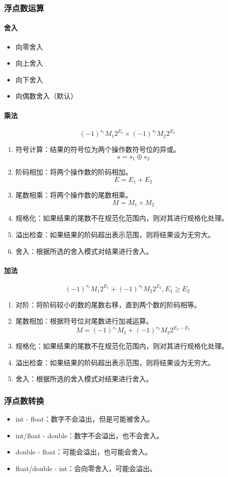 \subsubsection{浮点数运算}
\paragraph{舍入}
\begin{itemize}
    \item 向零舍入
    \item 向上舍入
    \item 向下舍入
    \item 向偶数舍入（默认）
\end{itemize}

\paragraph{乘法}
$$ (-1)^{s_1}M_1 2^{E_1} \times (-1)^{s_2}M_2 2^{E_2} $$
\begin{enumerate}
    \item 符号计算：结果的符号位为两个操作数符号位的异或。
    $$s = s_1 \oplus s_2$$
    \item 阶码相加：将两个操作数的阶码相加。
    $$E = E_1 + E_2$$
    \item 尾数相乘：将两个操作数的尾数相乘。
    $$M = M_1 \times M_2$$
    \item 规格化：如果结果的尾数不在规范化范围内，则对其进行规格化处理。
    \item 溢出检查：如果结果的阶码超出表示范围，则将结果设为无穷大。
    \item 舍入：根据所选的舍入模式对结果进行舍入。
\end{enumerate}

\paragraph{加法}
$$ (-1)^{s_1}M_1 2^{E_1} + (-1)^{s_2}M_2 2^{E_2}, E_1 \geq E_2$$
\begin{enumerate}
    \item 对阶：将阶码较小的数的尾数右移，直到两个数的阶码相等。
    \item 尾数相加：根据符号位对尾数进行加减运算。
    $$M = (-1)^{s_1} M_1 + (-1)^{s_2} M_2 2^{E_2 - E_1}$$
    \item 规格化：如果结果的尾数不在规范化范围内，则对其进行规格化处理。
    \item 溢出检查：如果结果的阶码超出表示范围，则将结果设为无穷大。
    \item 舍入：根据所选的舍入模式对结果进行舍入。
\end{enumerate}

\subsubsection{浮点数转换}
\begin{itemize}
    \item int - float：数字不会溢出，但是可能被舍入。
    \item int/float - double：数字不会溢出，也不会舍入。
    \item double - float：可能会溢出，也可能会舍入。
    \item float/double - int：会向零舍入，可能会溢出。
\end{itemize}

\newpage